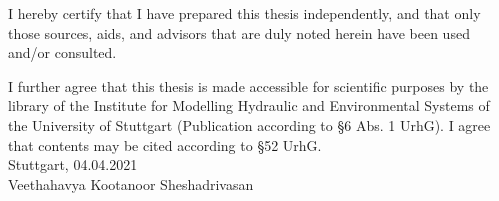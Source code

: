\newpage
\thispagestyle{empty}

\vspace*{\fill}

I hereby certify that I have prepared this thesis independently, and that only
those sources, aids, and advisors that are duly noted herein have been used
and/or consulted.

I further agree that this thesis is made accessible for scientific purposes by the
library of the Institute for Modelling Hydraulic and Environmental Systems of
the University of Stuttgart (Publication according to {\S}6 Abs. 1 UrhG).
I agree that contents may be cited according to {\S}52 UrhG.\\[1cm]
Stuttgart, 04.04.2021\\[2cm]
Veethahavya Kootanoor Sheshadrivasan

\endinput